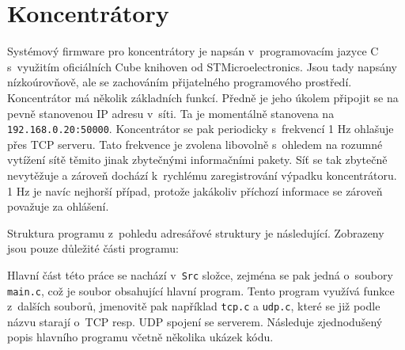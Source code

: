 \section{Koncentrátory}
Systémový firmware pro koncentrátory  je napsán v~programovacím jazyce C s~využitím oficiálních Cube knihoven od STMicroelectronics. Jsou tady napsány nízkoúrovňově, ale se zachováním přijatelného programového pro\-stře\-dí. Koncentrátor má několik základních funkcí. Předně je jeho úkolem připojit se na pevně stanovenou IP adresu v~síti. Ta je momentálně stanovena na \texttt{192.168.0.20:50000}. Koncentrátor se pak periodicky s~frekvencí 1 Hz o\-hla\-šu\-je přes TCP serveru. Tato frekvence je zvolena libovolně s~ohledem na rozumné vytížení sítě těmito jinak zbytečnými informačními pakety. Síť se tak zbytečně nevytěžuje a zároveň dochází k~rychlému zaregistrování výpadku koncentrátoru. 1 Hz je navíc nejhorší případ, protože jakákoliv příchozí informace se zároveň považuje za ohlášení.

Struktura programu z~pohledu adresářové struktury je následující. Zobrazeny jsou pouze důležité části programu:

\begin{figure}[H]
\end{figure}

Hlavní část této práce se nachází v~\texttt{Src} složce, zejména se pak jedná o~soubory \texttt{main.c}, což je soubor obsahující hlavní program. Tento program využívá funkce z~dalších souborů, jmenovitě pak například \texttt{tcp.c} a \texttt{udp.c}, které se již podle názvu starají o~TCP resp. UDP spojení se serverem. Následuje zjednodušený popis hlavního programu včetně několika ukázek kódu.

